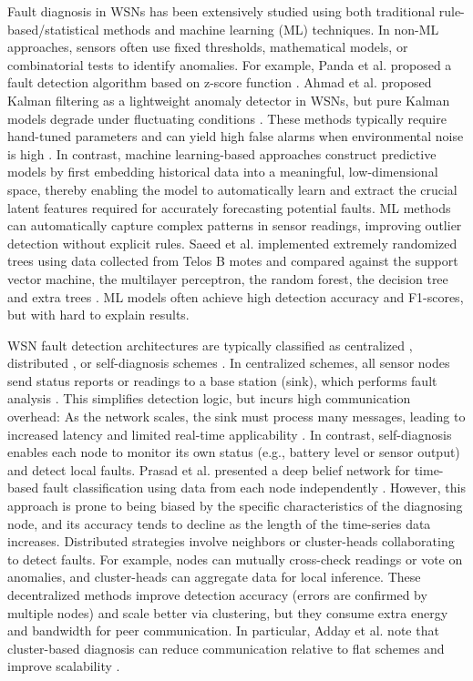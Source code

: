 Fault diagnosis in WSNs has been extensively studied using both traditional rule-based/statistical methods and machine learning (ML) techniques. In non-ML approaches, sensors often use fixed thresholds, mathematical models, or combinatorial tests to identify anomalies. For example, Panda et al. proposed a fault detection algorithm based on z-score function \cite{Panda2014}. Ahmad et al. proposed Kalman filtering as a lightweight anomaly detector in WSNs, but pure Kalman models degrade under fluctuating conditions \cite{Ahmad2024}. These methods typically require hand-tuned parameters and can yield high false alarms when environmental noise is high \cite{Muhammed2017, Zhang2018}. In contrast, machine learning-based approaches construct predictive models by first embedding historical data into a meaningful, low-dimensional space, thereby enabling the model to automatically learn and extract the crucial latent features required for accurately forecasting potential faults. ML methods can automatically capture complex patterns in sensor readings, improving outlier detection without explicit rules. Saeed et al. implemented extremely randomized trees using data collected from Telos B motes and compared against the support vector machine, the multilayer perceptron, the random forest, the decision tree and extra trees \cite{Saeed2021}. ML models often achieve high detection accuracy and F1-scores, but with hard to explain results.

WSN fault detection architectures are typically classified as centralized \cite{Tolle2005, Ramanathan2004, Staddon2002}, distributed \cite{Chen2006, Munir2015}, or self-diagnosis schemes \cite{Prasad2023}. In centralized schemes, all sensor nodes send status reports or readings to a base station (sink), which performs fault analysis \cite{Panda2014}. This simplifies detection logic, but incurs high communication overhead: As the network scales, the sink must process many messages, leading to increased latency and limited real-time applicability \cite{Muhammed2017, Zhang2018}. In contrast, self-diagnosis enables each node to monitor its own status (e.g., battery level or sensor output) and detect local faults. Prasad et al. presented a deep belief network for time-based fault classification using data from each node independently \cite{Prasad2023}. However, this approach is prone to being biased by the specific characteristics of the diagnosing node, and its accuracy tends to decline as the length of the time-series data increases. Distributed strategies involve neighbors or cluster-heads collaborating to detect faults. For example, nodes can mutually cross-check readings or vote on anomalies, and cluster-heads can aggregate data for local inference. These decentralized methods improve detection accuracy (errors are confirmed by multiple nodes) and scale better via clustering, but they consume extra energy and bandwidth for peer communication. In particular, Adday et al. note that cluster-based diagnosis can reduce communication relative to flat schemes and improve scalability \cite{Adday2022}.

